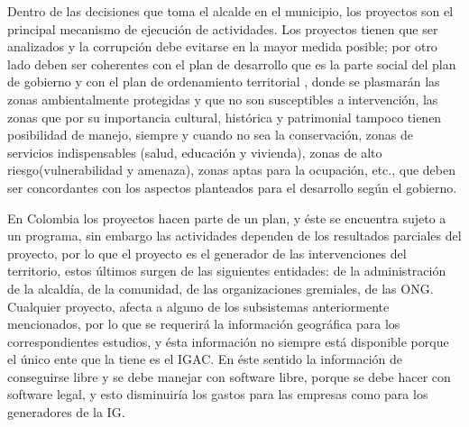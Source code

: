 \begin{multicols}{2}

 Dentro de las decisiones que toma el alcalde en el municipio, los proyectos son el principal mecanismo de ejecución de actividades. Los proyectos tienen que ser analizados y la corrupción debe evitarse en la mayor medida posible; por otro lado deben ser coherentes con el plan de desarrollo que es la parte social del plan de gobierno y con el plan de ordenamiento territorial , donde se plasmarán las zonas ambientalmente protegidas y que no son susceptibles a intervención, las zonas que por su importancia cultural, histórica y patrimonial  tampoco tienen posibilidad de manejo, siempre y cuando no sea la conservación, zonas de  servicios indispensables (salud, educación y vivienda), zonas de alto riesgo(vulnerabilidad y amenaza), zonas aptas para la ocupación, etc., que deben ser concordantes con los aspectos planteados para el desarrollo según el gobierno. 


En   Colombia los proyectos hacen parte de un plan, y éste se encuentra sujeto a un programa, sin embargo las actividades dependen de los resultados  parciales del proyecto, por lo que el proyecto es el generador de las intervenciones del territorio, estos últimos  surgen  de las siguientes entidades: de la administración de la alcaldía, de la comunidad, de las organizaciones gremiales, de las ONG.
Cualquier proyecto, afecta a alguno de los subsistemas anteriormente mencionados, por lo que se requerirá la información geográfica para los correspondientes estudios, y ésta información no siempre está disponible porque el único ente que la tiene es el IGAC. En éste sentido la información de conseguirse libre y se debe manejar con software libre, porque se debe hacer con software legal, y esto disminuiría los gastos para las empresas como para los generadores de la IG.




\end{multicols}

